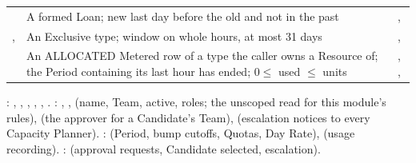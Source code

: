 {\begin{longtable}{@{}L{0.24\textwidth}L{0.46\textwidth}L{0.26\textwidth}@{}}
 & A formed Loan; new last day before the old and not in the past & ,  \\
,  & An Exclusive type; window on whole hours, at most 31 days & ,  \\
 & An ALLOCATED Metered row of a type the caller owns a Resource of; the Period containing its last hour has ended; $0 \le$ used $\le$ units & , ,  \\
\end{longtable}}

: , , , , , . : , ,  (name, Team, active, roles; the unscoped read for this module's rules),  (the approver for a Candidate's Team),  (escalation notices to every Capacity Planner). :  (Period, bump cutoffs, Quotas, Day Rate),  (usage recording). :  (approval requests, Candidate selected, escalation).

